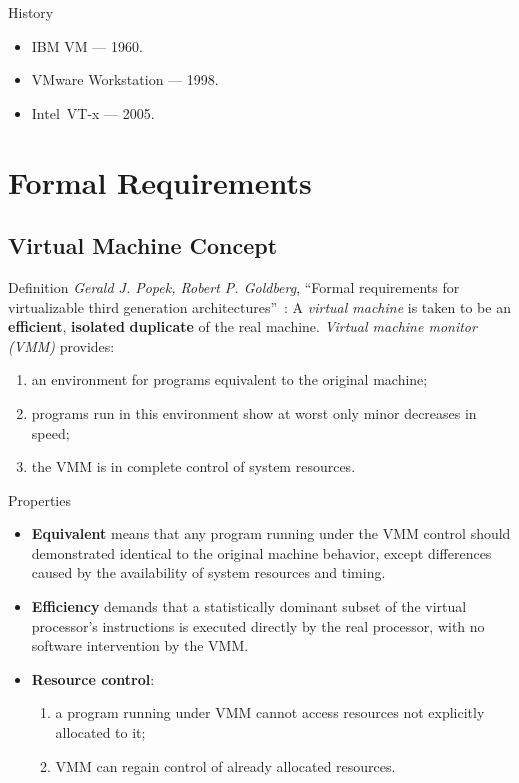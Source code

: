 \begin{frame}{History}
\begin{itemize}
\item IBM VM --- 1960.
\item VMware Workstation --- 1998.
\item Intel\reg~VT-x --- 2005.
\end{itemize}
\end{frame}

\section{Formal Requirements}

\subsection{Virtual Machine Concept}

\begin{frame}{Definition}
\textit{Gerald J. Popek, Robert P. Goldberg}, ``Formal requirements for
virtualizable third generation
architectures''~\cite{popek-goldberg-vm-requirements}:
\vfill\pause
A \textit{virtual machine} is taken to be an \textbf{efficient},
\textbf{isolated} \textbf{duplicate} of the real machine.
\vfill\pause
\textit{Virtual machine monitor (VMM)} provides:
\begin{enumerate}
\item an environment for programs equivalent to the original machine;\pause
\item programs run in this environment show at worst only minor decreases in
  speed;\pause
\item the VMM is in complete control of system resources.
\end{enumerate}
\end{frame}

\begin{frame}{Properties}
\begin{itemize}
\item \textbf{Equivalent} means that any program running under the
  VMM control should demonstrated identical to the original machine behavior,
  except differences caused by the availability of system resources and
  timing.\pause
\item \textbf{Efficiency} demands that a statistically dominant subset of the
  virtual processor's instructions is executed directly by the real processor,
  with no software intervention by the VMM.\pause
\item \textbf{Resource control}:
  \begin{enumerate}
  \item a program running under VMM cannot access resources not explicitly
    allocated to it;
  \item VMM can regain control of already allocated resources.
  \end{enumerate}
\end{itemize}
\end{frame}

